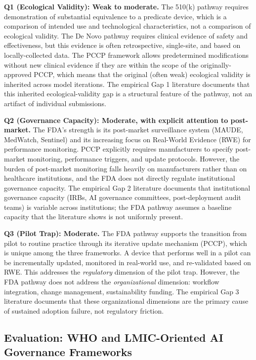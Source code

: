 \noindent\textbf{Q1 (Ecological Validity): Weak to moderate.}
The 510(k) pathway requires demonstration of substantial
equivalence to a predicate device, which is a comparison of
intended use and technological characteristics, not a
comparison of ecological validity. The De Novo pathway
requires clinical evidence of safety and effectiveness, but
this evidence is often retrospective, single-site, and
based on locally-collected data. The PCCP framework allows
predetermined modifications without new clinical evidence
if they are within the scope of the originally-approved
PCCP, which means that the original (often weak)
ecological validity is inherited across model iterations.
The empirical Gap 1 literature documents that this
inherited ecological-validity gap is a structural feature
of the pathway, not an artifact of individual submissions.

\noindent\textbf{Q2 (Governance Capacity): Moderate, with
explicit attention to post-market.}
The FDA's strength is its post-market surveillance system
(MAUDE, MedWatch, Sentinel) and its increasing focus on
Real-World Evidence (RWE) for performance monitoring.
PCCP explicitly requires manufacturers to specify
post-market monitoring, performance triggers, and update
protocols. However, the burden of post-market monitoring
falls heavily on manufacturers rather than on healthcare
institutions, and the FDA does not directly regulate
institutional governance capacity. The empirical Gap 2
literature documents that institutional governance capacity
(IRBs, AI governance committees, post-deployment audit
teams) is variable across institutions; the FDA pathway
assumes a baseline capacity that the literature shows is
not uniformly present.

\noindent\textbf{Q3 (Pilot Trap): Moderate.}
The FDA pathway supports the transition from pilot to
routine practice through its iterative update mechanism
(PCCP), which is unique among the three frameworks. A
device that performs well in a pilot can be incrementally
updated, monitored in real-world use, and re-validated
based on RWE. This addresses the \textit{regulatory}
dimension of the pilot trap. However, the FDA pathway
does not address the \textit{organizational} dimension:
workflow integration, change management, sustainability
funding. The empirical Gap 3 literature documents that
these organizational dimensions are the primary cause of
sustained adoption failure, not regulatory friction.

\subsection{Evaluation: WHO and LMIC-Oriented AI Governance Frameworks}
\label{sec:who_lmic}

